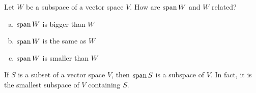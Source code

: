 \begin{applicationActivities}
\begin{activity}{10}
Let \(W\) be a subspace of a vector space \(V\).  How are \(\operatorname{span} W\) and \(W\) related?
\begin{enumerate}[(a)]
\item \(\operatorname{span} W\) is bigger than \(W\)
\item \(\operatorname{span} W\) is the same as \(W\)
\item \(\operatorname{span} W\) is smaller than \(W\)
\end{enumerate}
\end{activity}

\begin{fact}
  If \(S\) is a subset of a vector space \(V\), then
  \(\operatorname{span} S\) is a subspace of \(V\).  In fact, it is the smallest subspace of \(V\) containing \(S\).
\end{fact}

\end{applicationActivities}
